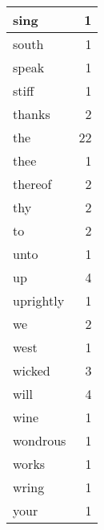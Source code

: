 \begin{center}
\begin{longtable}{l|r}
sing & 1 \\ \hline
south & 1 \\ \hline
speak & 1 \\ \hline
stiff & 1 \\ \hline
thanks & 2 \\ \hline
the & 22 \\ \hline
thee & 1 \\ \hline
thereof & 2 \\ \hline
thy & 2 \\ \hline
to & 2 \\ \hline
unto & 1 \\ \hline
up & 4 \\ \hline
uprightly & 1 \\ \hline
we & 2 \\ \hline
west & 1 \\ \hline
wicked & 3 \\ \hline
will & 4 \\ \hline
wine & 1 \\ \hline
wondrous & 1 \\ \hline
works & 1 \\ \hline
wring & 1 \\ \hline
your & 1 \\ \hline
\end{longtable}
\end{center}



\normalsize



